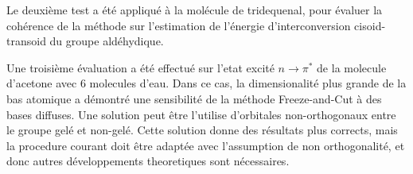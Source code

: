 Le deuxi\`eme test a \'et\'e appliqu\'e \`a la mol\'ecule de tridequenal,
pour \'evaluer la coh\'erence de la m\'ethode sur l'estimation de
l'\'energie d'interconversion cisoid-transoid du groupe ald\'ehydique.

Une troisi\`eme \'evaluation a \'et\'e effectu\'e sur l'etat excit\'e $n \rightarrow
\pi^{*}$ de la molecule d'acetone avec 6 molecules d'eau. Dans ce cas, la
dimensionalit\'e plus grande de la bas atomique a d\'emontr\'e une
sensibilit\'e de la m\'ethode Freeze-and-Cut \`a des bases diffuses. Une solution
peut \^etre l'utilise d'orbitales non-orthogonaux entre le groupe gel\'e et
non-gel\'e. Cette solution donne des r\'esultats plus corrects, mais la
procedure courant doit \^etre adapt\'ee avec l'assumption de non
orthogonalit\'e, et donc autres d\'eveloppements theoretiques sont
n\'ecessaires.

